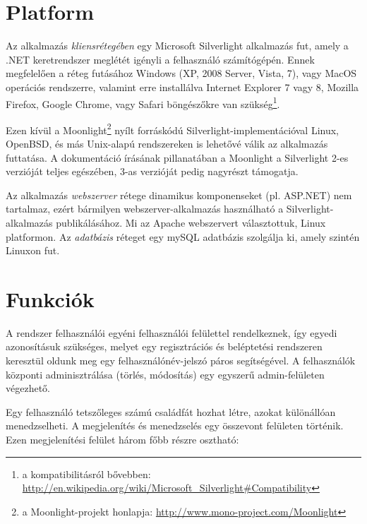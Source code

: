 \section{Platform}\label{sect:platform}

Az alkalmazás \emph{kliensrétegében} egy Microsoft Silverlight alkalmazás fut, amely a .NET keretrendszer meglétét igényli a felhasználó számítógépén. Ennek megfelelően a réteg futásához Windows (XP, 2008 Server, Vista, 7), vagy MacOS operációs rendszerre, valamint erre installálva Internet Explorer 7 vagy 8, Mozilla Firefox, Google Chrome, vagy Safari böngészőkre van szükség\footnote{a kompatibilitásról bővebben:  \url{http://en.wikipedia.org/wiki/Microsoft\_Silverlight\#Compatibility}}.

Ezen kívül a Moonlight\footnote{a Moonlight-projekt honlapja: \url{http://www.mono-project.com/Moonlight}} nyílt forráskódú Silverlight-implementációval Linux, OpenBSD, és más Unix-alapú rendszereken is lehetővé válik az alkalmazás futtatása. A dokumentáció írásának pillanatában a Moonlight a Silverlight 2-es verzióját teljes egészében, 3-as verzióját pedig nagyrészt támogatja.

\bigskip

Az alkalmazás \emph{webszerver} rétege dinamikus komponenseket (pl. ASP.NET) nem tartalmaz, ezért bármilyen webszerver-alkalmazás használható a Silverlight-alkalmazás publikálásához. Mi az Apache webszervert választottuk, Linux platformon. Az \emph{adatbázis} réteget egy mySQL adatbázis szolgálja ki, amely szintén Linuxon fut.

\section{Funkciók}\label{sect:funkciok}

A rendszer felhasználói egyéni felhasználói felülettel rendelkeznek, így egyedi azonosításuk szükséges, melyet egy regisztrációs és beléptetési rendszeren keresztül oldunk meg egy felhasználónév-jelszó páros segítségével. A felhasználók központi adminisztrálása (törlés, módosítás) egy egyszerű admin-felületen végezhető.

\bigskip

Egy felhasználó tetszőleges számú családfát hozhat létre, azokat különállóan menedzselheti. A megjelenítés és menedzselés egy összevont felületen történik. Ezen megjelenítési felület három főbb részre osztható:


